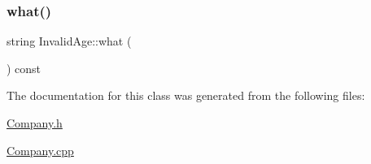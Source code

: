 \subsubsection{\texorpdfstring{what()}{what()}}
{\footnotesize\ttfamily string Invalid\+Age\+::what (\begin{DoxyParamCaption}{ }\end{DoxyParamCaption}) const}



The documentation for this class was generated from the following files\+:\begin{DoxyCompactItemize}
\item 
\mbox{\hyperlink{_company_8h}{Company.\+h}}\item 
\mbox{\hyperlink{_company_8cpp}{Company.\+cpp}}\end{DoxyCompactItemize}
